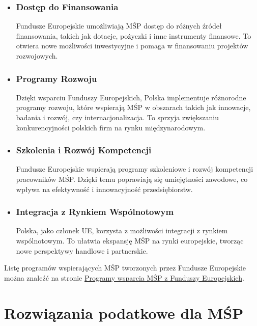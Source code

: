 \documentclass[11pt]{article}
\begin{document}
\begin{itemize}
  \item \subsubsection*{Dostęp do Finansowania}
        Fundusze Europejskie umożliwiają MŚP dostęp do różnych źródeł finansowania, takich jak dotacje, pożyczki i inne instrumenty finansowe.
        To otwiera nowe możliwości inwestycyjne i pomaga w finansowaniu projektów rozwojowych.
  \item \subsubsection*{Programy Rozwoju}
        Dzięki wsparciu Funduszy Europejskich, Polska implementuje różnorodne programy rozwoju, które wspierają MŚP w obszarach takich jak innowacje,
        badania i rozwój, czy internacjonalizacja. To sprzyja zwiększaniu konkurencyjności polskich firm na rynku międzynarodowym.
  \item \subsubsection*{Szkolenia i Rozwój Kompetencji}
        Fundusze Europejskie wspierają programy szkoleniowe i rozwój kompetencji pracowników MŚP. Dzięki temu poprawiają się umiejętności zawodowe,
        co wpływa na efektywność i innowacyjność przedsiębiorstw.
  \item \subsubsection*{Integracja z Rynkiem Wspólnotowym}
        Polska, jako członek UE, korzysta z możliwości integracji z rynkiem wspólnotowym. To ułatwia ekspansję MŚP na rynki europejskie,
        tworząc nowe perspektywy handlowe i partnerskie.
\end{itemize}

Listę programów wspierających MŚP tworzonych przez Fundusze Europejskie można znaleźć na stronie
\href{https://www.funduszeeuropejskie.gov.pl/wyszukiwarka/mikro-male-i-srednie-przedsiebiorstwa/}{Programy wsparcia MŚP z Funduszy Europejskich}.

\section*{Rozwiązania podatkowe dla MŚP}
\end{document}
